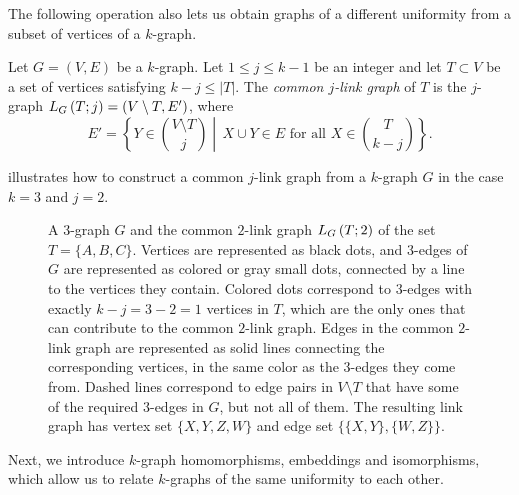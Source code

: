 The following operation also lets us obtain graphs of a
different uniformity from a subset of vertices of a $k$-graph.

\begin{definition} \label{def:link}
    Let $G = (V, E)$ be a $k$-graph.
    Let $1 \leq j \leq k - 1$ be an integer and let
    $T \subset V$ be a set of vertices satisfying $k - j \leq |T|$.
    The \emph{common $j$-link graph} of $T$ is the $j$-graph $L_{G}\left(T; j\right) = (V \setminus T, E')$, where
    \[
        E' = \left\{Y \in \binom{V \setminus T}{j}\middle\vert \, X \cup Y \in E \text{ for all } X \in \binom{T}{k-j}\right\}.
    \]
\end{definition}

 illustrates how to construct
a common $j$-link graph from a $k$-graph $G$ in the case $k=3$ and $j=2$.

\begin{figure}[ht]
    \centering
    
    \caption{A $3$-graph $G$ and the common $2$-link graph $L_{G}\left(T; 2\right)$ of the set $T = \{A, B, C\}$.
        Vertices are represented as black dots, and $3$-edges of $G$ are represented as colored or gray small dots,
        connected by a line to the vertices they contain.
        Colored dots correspond to $3$-edges with exactly
        $k - j = 3 - 2 = 1$ vertices in $T$, which are the only ones that can contribute to the common $2$-link graph.
        Edges in the common $2$-link graph are represented as solid lines connecting the corresponding vertices,
        in the same color as the $3$-edges they come from.
        Dashed lines correspond to edge pairs
        in $V \setminus T$ that have some of the required $3$-edges in $G$, but not all of them.
        The resulting link graph has vertex set $\{X, Y, Z, W\}$ and edge set
        $\{\{X, Y\}, \{W, Z\}\}$.
    }
    \label{fig:link}
\end{figure}

Next, we introduce $k$-graph homomorphisms, embeddings and isomorphisms, which allow us
to relate $k$-graphs of the same uniformity to each other.

